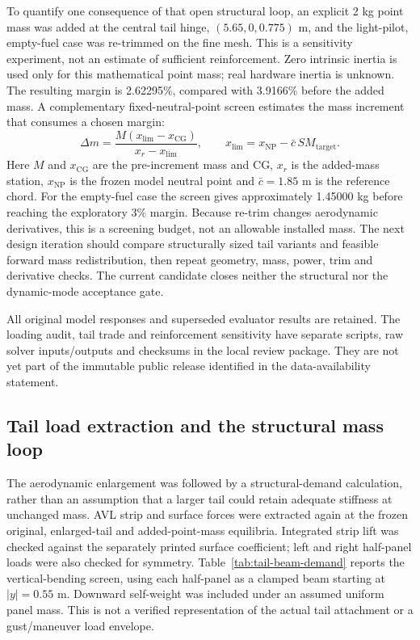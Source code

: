 \documentclass[10pt,letterpaper]{article}
\begin{document}
To quantify one consequence of that open structural loop, an explicit
2 kg point mass was added at the central tail hinge, $(5.65,0,0.775)$ m,
and the light-pilot, empty-fuel case was re-trimmed on the fine mesh. This is
a sensitivity experiment, not an estimate of sufficient reinforcement.
Zero intrinsic inertia is used only for this mathematical point mass; real
hardware inertia is unknown. The resulting margin is 2.62295\%, compared
with 3.9166\% before the added mass. A complementary fixed-neutral-point
screen estimates the mass increment that consumes a chosen margin:
\begin{equation}
 \Delta m = \frac{M(x_{\mathrm{lim}}-x_{\mathrm{CG}})}
 {x_r-x_{\mathrm{lim}}},\qquad
 x_{\mathrm{lim}}=x_{\mathrm{NP}}-\bar c\,SM_{\mathrm{target}}.
\label{eq:tail-mass-budget}
\end{equation}
Here $M$ and $x_{\mathrm{CG}}$ are the pre-increment mass and CG, $x_r$ is the
added-mass station, $x_{\mathrm{NP}}$ is the frozen model neutral point and
$\bar c=1.85$ m is the reference chord. For the empty-fuel case the screen
gives approximately 1.45000 kg before reaching the exploratory 3\% margin.
Because re-trim changes aerodynamic derivatives, this is a screening budget,
not an allowable installed mass. The next design iteration should compare
structurally sized tail variants and feasible forward mass redistribution,
then repeat geometry, mass, power, trim and derivative checks. The current
candidate closes neither the structural nor the dynamic-mode acceptance gate.

All original model responses and superseded evaluator results are retained.
The loading audit, tail trade and reinforcement sensitivity have separate
scripts, raw solver inputs/outputs and checksums in the local review package.
They are not yet part of the immutable public release identified in the
data-availability statement.


\subsection{Tail load extraction and the structural mass loop}
\label{sec:tail-structural-loop}

The aerodynamic enlargement was followed by a structural-demand calculation,
rather than an assumption that a larger tail could retain adequate stiffness
at unchanged mass. AVL strip and surface forces were extracted again at the
frozen original, enlarged-tail and added-point-mass equilibria. Integrated
strip lift was checked against the separately printed surface coefficient;
left and right half-panel loads were also checked for symmetry. Table~\ref{tab:tail-beam-demand}
reports the vertical-bending screen, using each half-panel as a clamped beam
starting at $|y|=0.55$ m. Downward self-weight was included under an assumed
uniform panel mass. This is not a verified representation of the actual
tail attachment or a gust/maneuver load envelope.
\end{document}
